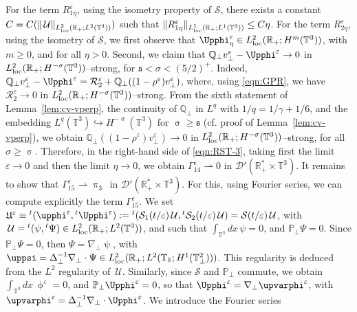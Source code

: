 \documentclass[11pt,reqno]{amsart}
\def \R{{\mathbb{R}}}
\def \Q{{\mathbb{Q}}}
\def \T{{\mathbb{T}}}
\def \P{{\mathbb{P}}}
\newcommand{\myparallel}{{\mkern3mu\vphantom{\perp}\vrule depth 0pt\mkern2mu\vrule depth 0pt\mkern3mu}}
\begin{document}
  For the term $ R_{1\eta}^\varepsilon$, using the isometry property of $\mathcal S$, there exists a constant $ C=  C(\| \, \mathcal U\|_{L_{\rm loc}^2(\R_+;L^2(\T^3))})$ such that $\| R_{1\eta}^\varepsilon\|_{L_{\rm loc}^1(\R_+;L^1(\T^3))}  \leq  C \eta $. For the term $ R_{2\eta}^\varepsilon$,  using the isometry of $\mathcal S$, we first observe that $\Upphi_\eta^\varepsilon \in L_{\rm loc}^2(\R_+;H^m(\T^3)) $, with $m\geq 0$, and for all $\eta >0$. Second, we claim that $\Q_\perp v_\perp^\varepsilon-\Upphi^\varepsilon \rightarrow 0$ in $L_{\rm loc}^2(\R_+;H^{-\sigma}(\T^3))$--strong, for $\mathfrak s <\sigma < (5/2)^+$. Indeed,  $\Q_\perp v_\perp^\varepsilon-\Upphi^\varepsilon= \mathcal R_2^\varepsilon + \Q_\perp ((1-\rho^\varepsilon) v_\perp^\varepsilon)$, where, using \eqref{eqn:GPR}, we have $\mathcal R_2^\varepsilon \rightarrow 0$ in $L_{\rm loc}^2(\R_+;H^{-\sigma}(\T^3))$--strong. From the sixth statement  of Lemma~\ref{lem:cv-vperp}, the continuity of $\Q_\perp$ in $L^q$ with $1/q=1/\gamma+1/6$, and the embedding $L^q(\T^3) \hookrightarrow H^{-\upsigma}(\T^3)$ for $\upsigma \geq \mathfrak s$ (cf. proof of  Lemma~\ref{lem:cv-vperp}), we obtain $\Q_\perp ((1-\rho^\varepsilon) v_\perp^\varepsilon)\rightarrow 0$ in $L_{\rm loc}^2(\R_+;H^{-\sigma}(\T^3))$--strong, for all $\sigma\geq \upsigma$. Therefore, in the right-hand side of \eqref {eqn:RST-3}, taking first the limit $\varepsilon \rightarrow 0$ and then the limit $\eta \rightarrow 0$, we obtain $\Gamma_{14}^\varepsilon \rightharpoonup 0 $ in $\mathcal D'(\R_+^* \times \T^3)$. It remains to show that  $\Gamma_{15}^\varepsilon \rightharpoonup \uppi_3 \,$ in $\mathcal D'(\R_+^*\times \T^3)$. For this, using Fourier series, we can  compute explicitly the term $\Gamma_{15}^\varepsilon$. We set $\mathfrak U^\varepsilon \equiv {}^t(\upphi^\varepsilon, {}^t \Upphi^\varepsilon) := {}^t(\mathcal S_1(t/\varepsilon) \, \mathcal U,{}^t\mathcal S_2(t/\varepsilon) \, \mathcal U) =  \mathcal S(t/\varepsilon) \, \mathcal U $, with $\, \mathcal U={}^t(\psi,{}^t \Psi)\in L_{\rm loc}^2(\R_+; L^2(\T^3))$, and such that $\int_{\T^3} dx\,\psi=0$, and  $\P_\perp\Psi=0 $. Since $\P_\perp\Psi=0$, then $\Psi =\nabla_\perp \uppsi$, with $\uppsi = \Delta_\perp^{-1}\nabla_\perp \cdot \Psi \in L_{\rm loc}^2(\R_+; L^2(\T_\myparallel ;H^1(\T_\perp^2)))$. This regularity is deduced from the $L^2$ regularity of $\, \mathcal U$. Similarly, since $\mathcal S$ and $\P_\perp$ commute, we obtain $\int_{\T^3} dx\,\upphi^\varepsilon =0 $, and  $\P_\perp\Upphi^\varepsilon=0 $, so that $\Upphi^\varepsilon =\nabla_\perp \upvarphi^\varepsilon$, with $\upvarphi^\varepsilon = \Delta_\perp^{-1}\nabla_\perp \cdot \Upphi^\varepsilon$. We introduce the Fourier series
\end{document}
